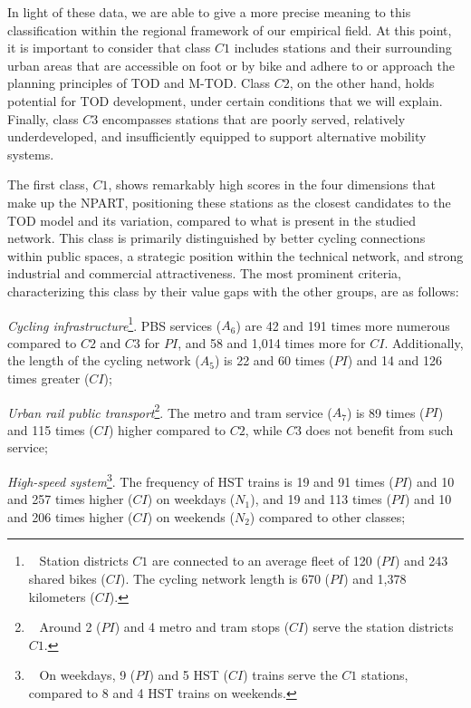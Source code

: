 \begin{refsegment}
In light of these data, we are able to give a more precise meaning to this classification within the regional framework of our empirical field. At this point, it is important to consider that class \(C1\) includes stations and their surrounding urban areas that are accessible on foot or by bike and adhere to or approach the planning principles of \acrshort{TOD} and \acrshort{M-TOD}. Class \(C2\), on the other hand, holds potential for \acrshort{TOD} development, under certain conditions that we will explain. Finally, class \(C3\) encompasses stations that are poorly served, relatively underdeveloped, and insufficiently equipped to support alternative mobility systems.%

The first class, \(C1\), shows remarkably high scores in the four dimensions that make up the \acrshort{NPART}, positioning these stations as the closest candidates to the \acrshort{TOD} model and its variation, compared to what is present in the studied network. This class is primarily distinguished by better cycling connections within public spaces, a strategic position within the technical network, and strong industrial and commercial attractiveness. The most prominent criteria, characterizing this class by their value gaps with the other groups, are as follows:
\begin{customitemize}
    \item \textsl{Cycling infrastructure}\footnote{~
        Station districts \(C1\) are connected to an average fleet of 120 (\(PI\)) and 243 shared bikes (\(CI\)). The cycling network length is 670 (\(PI\)) and 1,378 kilometers (\(CI\)).
    }. \acrshort{PBS} services (\(A_{6}\)) are 42 and 191 times more numerous compared to \(C2\) and \(C3\) for \(PI\), and 58 and 1,014 times more for \(CI\). Additionally, the length of the cycling network (\(A_{5}\)) is 22 and 60 times (\(PI\)) and 14 and 126 times greater (\(CI\));
    \item \textsl{Urban rail public transport}\footnote{~
        Around 2 (\(PI\)) and 4 metro and tram stops (\(CI\)) serve the station districts \(C1\).
    }. The metro and tram service (\(A_{7}\)) is 89 times (\(PI\)) and 115 times (\(CI\)) higher compared to \(C2\), while \(C3\) does not benefit from such service;
    \item \textsl{High-speed system}\footnote{~
        On weekdays, 9 (\(PI\)) and 5 \acrshort{HST} (\(CI\)) trains serve the \(C1\) stations, compared to 8 and 4 \acrshort{HST} trains on weekends.
    }. The frequency of \acrshort{HST} trains is 19 and 91 times (\(PI\)) and 10 and 257 times higher (\(CI\)) on weekdays (\(N_{1}\)), and 19 and 113 times (\(PI\)) and 10 and 206 times higher (\(CI\)) on weekends (\(N_{2}\)) compared to other classes;

\end{customitemize}
\end{refsegment}
